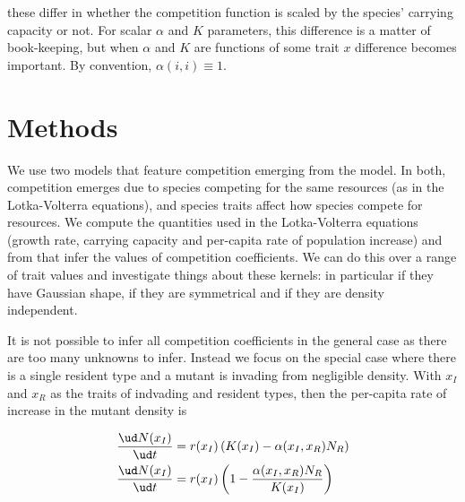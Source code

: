 these differ in whether the competition function is scaled by the
species' carrying capacity or not.  For scalar $\alpha$ and $K$
parameters, this difference is a matter of book-keeping, but when
$\alpha$ and $K$ are functions of some trait $x$ difference becomes
important.  By convention, $\alpha(i, i) \equiv 1$.

\section{Methods}

%
We use two models that feature competition emerging from the model.
In both, competition emerges due to species competing for the same
resources (as in the Lotka-Volterra equations), and species traits
affect how species compete for resources.  We compute the quantities
used in the Lotka-Volterra equations (growth rate, carrying capacity
and per-capita rate of population increase) and from that infer the
values of competition coefficients.
We can do this over a range of trait values and investigate things
about these kernels: in particular if they have Gaussian shape, if
they are symmetrical and if they are density independent.

It is not possible to infer all competition coefficients in the
general case as there are too many unknowns to infer.  Instead we
focus on the special case where there is a single resident type and a
mutant is invading from negligible density.  With $x_I$ and $x_R$ as
the traits of indvading and resident types, then the per-capita rate
of increase in the mutant density is

\begin{subequations}
  \label{eq:LVi}
  \begin{align}
    \frac{\ud N(x_I)}{\ud t} &=
    r(x_I)\left(K(x_I) - \alpha(x_I, x_R) N_R\right)\\
    \frac{\ud N(x_I)}{\ud t} &=
    r(x_I)\left(1 - \frac{\alpha(x_I, x_R) N_R}{K(x_I)}\right)
  \end{align}
\end{subequations}

